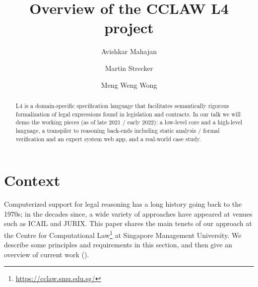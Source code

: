 \documentclass[runningheads]{llncs}
\begin{document}
\title{Overview of the CCLAW L4 project}

\author{
    Avishkar Mahajan \and
    Martin Strecker \and
    Meng Weng Wong
}
\maketitle

\begin{abstract}
L4 is a domain-specific specification language that facilitates semantically rigorous formalization of legal expressions found in legislation and contracts. In our talk we will demo the working pieces (as of late 2021 / early 2022): a low-level core and a high-level language, a transpiler to reasoning back-ends including static analysis / formal verification and an expert system web app, and a real-world case study.
\end{abstract}



\section{Context}\label{sec:context}

Computerized support for legal reasoning has a long history going back to the
1970s; in the decades since, a wide variety of approaches have appeared at venues such as ICAIL and JURIX.
This paper shares the main tenets of our approach at the Centre
for Computational Law\footnote{\url{https://cclaw.smu.edu.sg/}} at Singapore
Management University. We describe some principles and requirements in
this section, and then give an overview of current work
().
\end{document}
